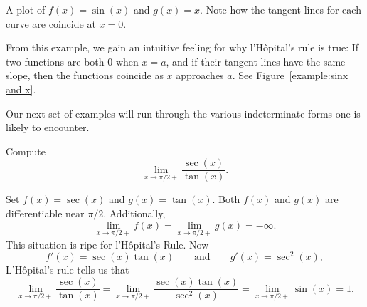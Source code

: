 \begin{marginfigure}[-1in]
\caption{A plot of $f(x)=\sin(x)$ and $g(x) = x$. Note how the tangent
  lines for each curve are coincide at $x=0$.}
\label{example:sinx and x}
\end{marginfigure}


From this example, we gain an intuitive feeling for why l'H\^opital's
rule is true: If two functions are both $0$ when $x=a$, and if their
tangent lines have the same slope, then the functions coincide as $x$
approaches $a$. See Figure~\ref{example:sinx and x}. 




Our next set of examples will run through the various indeterminate
forms one is likely to encounter.

\begin{example}[$\pmb\infty$/$\pmb\infty$] Compute 
\[
\lim_{x\to \pi/2+} \frac{\sec(x)}{\tan(x)}.
\]
\end{example}

\begin{solution}
Set $f(x) = \sec(x)$ and $g(x) = \tan(x)$. Both $f(x)$ and $g(x)$
are differentiable near $\pi/2$. Additionally,
\[
\lim_{x \to \pi/2+} f(x) = \lim_{x \to \pi/2+}g(x) = -\infty.
\]
This situation is ripe for l'H\^opital's Rule. Now 
\[
f'(x) = \sec(x)\tan(x) \qquad\text{and}\qquad g'(x) = \sec^2(x), 
\]
L'H\^opital's rule tells us that 
\[
\lim_{x\to \pi/2+} \frac{\sec(x)}{\tan(x)} = \lim_{x\to \pi/2+}
\frac{\sec(x)\tan(x)}{\sec^2(x)} = \lim_{x\to \pi/2+} \sin(x) =
1.
\]
\end{solution}



